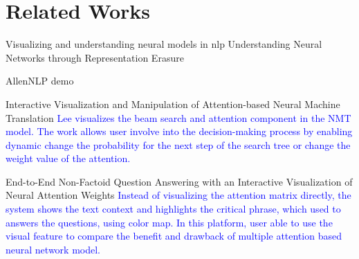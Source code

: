\section{Related Works}


Visualizing and understanding neural models in nlp
Understanding Neural Networks through Representation Erasure

AllenNLP demo 

Interactive Visualization and Manipulation of Attention-based Neural Machine Translation
\textcolor{blue}{Lee visualizes the beam search and attention component in the NMT model. The work allows user involve into the decision-making process by enabling dynamic change the probability for the next step of the search tree or change the weight value of the attention.}

End-to-End Non-Factoid Question Answering with an Interactive Visualization of Neural Attention Weights
\textcolor{blue}{Instead of visualizing the attention matrix directly, the system shows the text context and highlights the critical phrase, which used to answers the questions, using color map. In this platform, user able to use the visual feature to compare the benefit and drawback of multiple attention based neural network model.}
